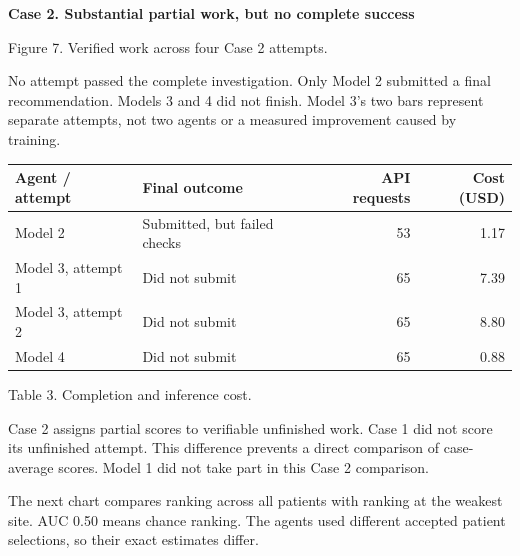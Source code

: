 \documentclass[10pt,a4paper]{article}
\newcommand{\reportcase}[2]{{\Large\bfseries Case #1. #2\par}\vspace{2mm}}
\newcommand{\reporthead}[1]{\vspace{2mm}{\normalsize\bfseries #1\par}}
\newcommand{\reportcaption}[1]{\par{\small\color{Muted}#1\par}\vspace{1mm}}
\begin{document}
\newpage
\reportcase{2}{Substantial partial work, but no complete success}
\begin{center}
\end{center}
\reportcaption{Figure 7. Verified work across four Case 2 attempts.}

No attempt passed the complete investigation. Only Model 2 submitted a final recommendation. Models 3 and 4 did not finish. Model 3's two bars represent separate attempts, not two agents or a measured improvement caused by training.

\begin{tabularx}{\textwidth}{@{}Ylrr@{}}\toprule
Agent / attempt & Final outcome & API requests & Cost (USD) \\\midrule
Model 2 & Submitted, but failed checks & 53 & 1.17 \\
Model 3, attempt 1 & Did not submit & 65 & 7.39 \\
Model 3, attempt 2 & Did not submit & 65 & 8.80 \\
Model 4 & Did not submit & 65 & 0.88 \\\bottomrule
\end{tabularx}
\reportcaption{Table 3. Completion and inference cost.}

Case 2 assigns partial scores to verifiable unfinished work. Case 1 did not score its unfinished attempt. This difference prevents a direct comparison of case-average scores. Model 1 did not take part in this Case 2 comparison.

\reporthead{The combined result concealed a site problem}
The next chart compares ranking across all patients with ranking at the weakest site. AUC 0.50 means chance ranking. The agents used different accepted patient selections, so their exact estimates differ.
\end{document}
